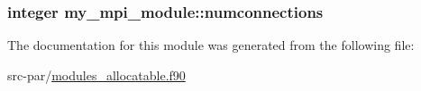 \hypertarget{classmy__mpi__module_a077353bce0dd655d563893b0c5f1f824}{
\subsubsection[{numconnections}]{\setlength{\rightskip}{0pt plus 5cm}integer my\-\_\-mpi\-\_\-module\-::numconnections}}\label{classmy__mpi__module_a077353bce0dd655d563893b0c5f1f824}


The documentation for this module was generated from the following file\-:\begin{DoxyCompactItemize}
\item 
src-\/par/\hyperlink{modules__allocatable_8f90}{modules\-\_\-allocatable.\-f90}\end{DoxyCompactItemize}
